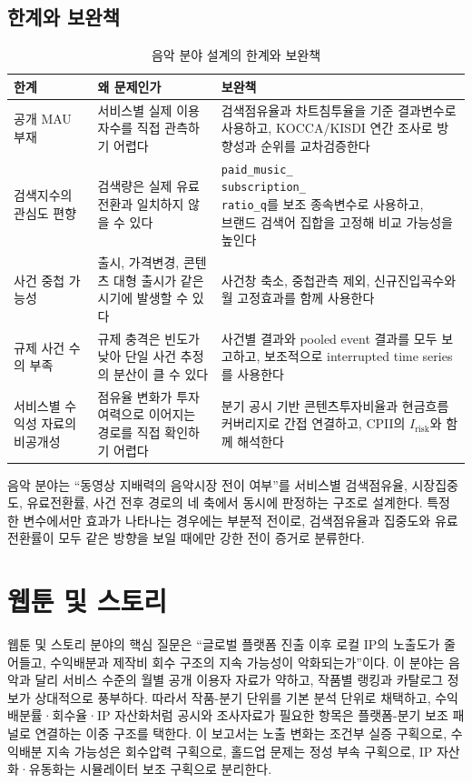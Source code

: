 \documentclass[11pt,a4paper]{report}
\newcommand{\WrapCell}[1]{\parbox[t]{\hsize}{\RaggedRight #1}}
\begin{document}
\subsection{한계와 보완책}
\begin{table}[H]
  \centering
  \small
  \caption{음악 분야 설계의 한계와 보완책}\label{tab:music_limitations}
  \begin{tabular}{p{4.2cm}p{4.6cm}p{4.2cm}}
    \toprule
    \rowcolor{ReportTableHead}
    한계 & 왜 문제인가 & 보완책 \\
    \midrule
    공개 MAU 부재 & 서비스별 실제 이용자수를 직접 관측하기 어렵다 & 검색점유율과 차트침투율을 기준 결과변수로 사용하고, KOCCA/KISDI 연간 조사로 방향성과 순위를 교차검증한다 \\
    검색지수의 관심도 편향 & 검색량은 실제 유료전환과 일치하지 않을 수 있다 & \WrapCell{\texttt{paid\_music\_}\\\texttt{subscription\_}\\\texttt{ratio\_q}를 보조 종속변수로 사용하고,\\브랜드 검색어 집합을 고정해 비교 가능성을 높인다} \\
    사건 중첩 가능성 & 출시, 가격변경, 콘텐츠 대형 출시가 같은 시기에 발생할 수 있다 & 사건창 축소, 중첩관측 제외, 신규진입곡수와 월 고정효과를 함께 사용한다 \\
    규제 사건 수의 부족 & 규제 충격은 빈도가 낮아 단일 사건 추정의 분산이 클 수 있다 & 사건별 결과와 pooled event 결과를 모두 보고하고, 보조적으로 interrupted time series를 사용한다 \\
    서비스별 수익성 자료의 비공개성 & 점유율 변화가 투자여력으로 이어지는 경로를 직접 확인하기 어렵다 & 분기 공시 기반 콘텐츠투자비율과 현금흐름 커버리지로 간접 연결하고, CPII의 $I_{\mathrm{risk}}$와 함께 해석한다 \\
    \bottomrule
  \end{tabular}
\end{table}

음악 분야는 ``동영상 지배력의 음악시장 전이 여부''를 서비스별 검색점유율, 시장집중도, 유료전환률, 사건 전후 경로의 네 축에서 동시에 판정하는 구조로 설계한다. 특정 한 변수에서만 효과가 나타나는 경우에는 부분적 전이로, 검색점유율과 집중도와 유료전환률이 모두 같은 방향을 보일 때에만 강한 전이 증거로 분류한다.

\section{웹툰 및 스토리}
웹툰 및 스토리 분야의 핵심 질문은 ``글로벌 플랫폼 진출 이후 로컬 IP의 노출도가 줄어들고, 수익배분과 제작비 회수 구조의 지속 가능성이 악화되는가''이다. 이 분야는 음악과 달리 서비스 수준의 월별 공개 이용자 자료가 약하고, 작품별 랭킹과 카탈로그 정보가 상대적으로 풍부하다. 따라서 작품-분기 단위를 기본 분석 단위로 채택하고, 수익배분률·회수율·IP 자산화처럼 공시와 조사자료가 필요한 항목은 플랫폼-분기 보조 패널로 연결하는 이중 구조를 택한다. 이 보고서는 노출 변화는 조건부 실증 구획으로, 수익배분 지속 가능성은 회수압력 구획으로, 홀드업 문제는 정성 부속 구획으로, IP 자산화·유동화는 시뮬레이터 보조 구획으로 분리한다.
\end{document}
